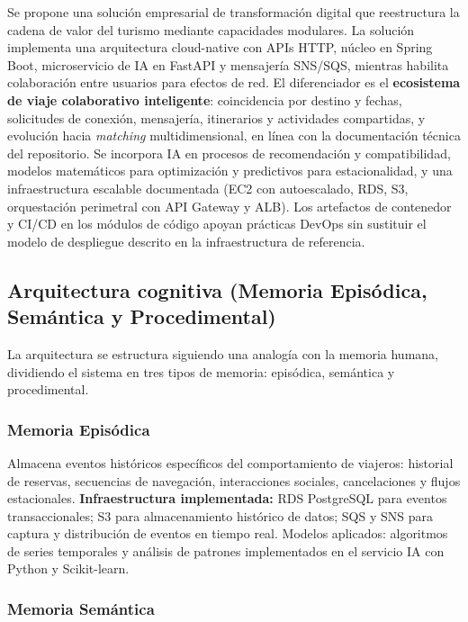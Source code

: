 \documentclass[12pt, letterpaper]{article}
\begin{document}
Se propone una solución empresarial de transformación digital que reestructura la cadena de valor del turismo mediante capacidades modulares. La solución implementa una arquitectura cloud-native con APIs HTTP, núcleo en Spring Boot, microservicio de IA en FastAPI y mensajería SNS/SQS, mientras habilita colaboración entre usuarios para efectos de red. El diferenciador es el \textbf{ecosistema de viaje colaborativo inteligente}: coincidencia por destino y fechas, solicitudes de conexión, mensajería, itinerarios y actividades compartidas, y evolución hacia \textit{matching} multidimensional, en línea con la documentación técnica del repositorio. Se incorpora IA en procesos de recomendación y compatibilidad, modelos matemáticos para optimización y predictivos para estacionalidad, y una infraestructura escalable documentada (EC2 con autoescalado, RDS, S3, orquestación perimetral con API Gateway y ALB). Los artefactos de contenedor y CI/CD en los módulos de código apoyan prácticas DevOps sin sustituir el modelo de despliegue descrito en la infraestructura de referencia.

\subsection{Arquitectura cognitiva (Memoria Episódica, Semántica y Procedimental)}

La arquitectura se estructura siguiendo una analogía con la memoria humana, dividiendo el sistema en tres tipos de memoria: episódica, semántica y procedimental.

\subsubsection{Memoria Episódica}

Almacena eventos históricos específicos del comportamiento de viajeros: historial de reservas, secuencias de navegación, interacciones sociales, cancelaciones y flujos estacionales. \textbf{Infraestructura implementada:} RDS PostgreSQL para eventos transaccionales; S3 para almacenamiento histórico de datos; SQS y SNS para captura y distribución de eventos en tiempo real. Modelos aplicados: algoritmos de series temporales y análisis de patrones implementados en el servicio IA con Python y Scikit-learn.

\subsubsection{Memoria Semántica}
\end{document}
